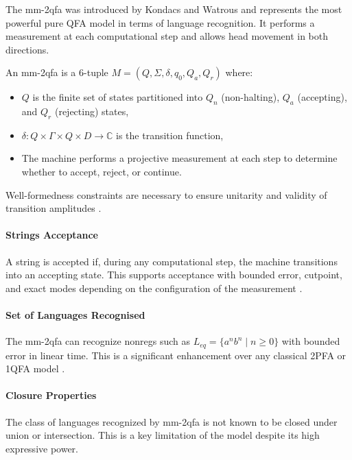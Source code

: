\subsubsection{}

The \gls{mm-2qfa} was introduced by Kondacs and Watrous \cite{kondacs1997power} and represents the most powerful pure QFA model in terms of language recognition. It performs a measurement at each computational step and allows head movement in both directions.

\begin{definition}
An \gls{mm-2qfa} is a 6-tuple $M = (Q, \Sigma, \delta, q_0, Q_a, Q_r)$ where:
\begin{itemize}
    \item $Q$ is the finite set of states partitioned into $Q_n$ (non-halting), $Q_a$ (accepting), and $Q_r$ (rejecting) states,
    \item $\delta: Q \times \Gamma \times Q \times D \to \mathbb{C}$ is the transition function,
    \item The machine performs a projective measurement at each step to determine whether to accept, reject, or continue.
\end{itemize}
\end{definition}
Well-formedness constraints are necessary to ensure unitarity and validity of transition amplitudes \cite{kondacs1997power}.

\paragraph{Strings Acceptance} A string is accepted if, during any computational step, the machine transitions into an accepting state. This supports acceptance with bounded error, cutpoint, and exact modes depending on the configuration of the measurement \cite{kondacs1997power}.

\paragraph{Set of Languages Recognised} The \gls{mm-2qfa} can recognize non\glspl{reg} such as $L_{eq} = \{ a^n b^n \mid n \geq 0 \}$ with bounded error in linear time. This is a significant enhancement over any classical 2PFA or 1QFA model \cite{kondacs1997power}.

\paragraph{Closure Properties} The class of languages recognized by \gls{mm-2qfa} is not known to be closed under union or intersection. This is a key limitation of the model despite its high expressive power.


